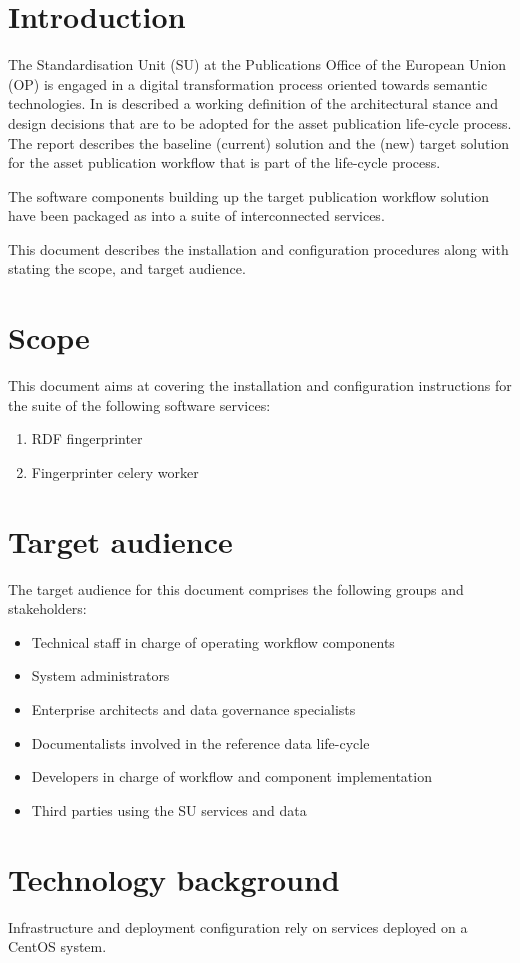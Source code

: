 \section{Introduction}
\label{sec:introduction}

The Standardisation Unit (SU) at the Publications Office of the European Union (OP) is engaged in a digital transformation process oriented towards semantic technologies. In \citep{costetchi2020d} is described a working definition of the architectural stance and design decisions that are to be adopted for the asset publication life-cycle process. The report describes the baseline (current) solution and the (new) target solution for the asset publication workflow that is part of the life-cycle process. 

The software components building up the target publication workflow solution have been packaged as into a suite of interconnected services.

This document describes the installation and configuration procedures along with stating the scope, and target audience.

\section{Scope}
\label{sec:scope}

This document aims at covering the installation and configuration instructions for the suite of the following software services:

\begin{enumerate}
	\item RDF fingerprinter
	\item Fingerprinter celery worker
\end{enumerate}

\section{Target audience}
\label{sec:audience}

The target audience for this document comprises the following groups and stakeholders:	
\begin{itemize}
	\item Technical staff in charge of operating workflow components
	\item System administrators
	\item Enterprise architects and data governance specialists
	\item Documentalists involved in the reference data life-cycle
	\item Developers in charge of workflow and component implementation
	\item Third parties using the SU services and data
\end{itemize}

\section{Technology background}
\label{sec:background}

Infrastructure and deployment configuration rely on services deployed on a CentOS system.